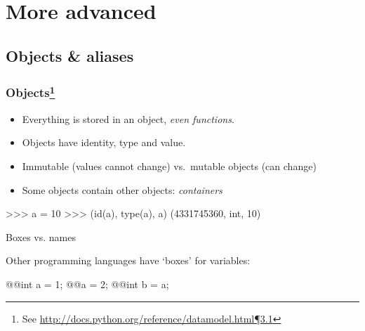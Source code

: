 \documentclass[xetex,10pt]{beamer}
\def\imgpath{../00-img/}
\def\spacer{\vspace*{1em}}
\begin{document}
\section{More advanced}

\subsection{Objects \& aliases}

\begin{frame}[fragile]
	\frametitle{Objects\footnote[frame]{See \href{http://docs.python.org/reference/datamodel.html\#objects-values-and-types}{http://docs.python.org/reference/datamodel.html¶3.1}}}

	\begin{itemize}
		\item Everything is stored in an object, \emph{even functions}.
		\pause
		\item Objects have identity, type and value.
		\pause
		\item Immutable (values cannot change) vs.\ mutable objects (can change)
		\pause
		\item Some objects contain other objects: \emph{containers}
	\end{itemize}
	
	\spacer
	
	\begin{python}
	>>> a = 10
	>>> (id(a), type(a), a)
	(4331745360, int, 10)
	\end{python}

\end{frame}

\begin{frame}[fragile]{Boxes vs. names}
	
	Other programming languages have `boxes' for variables:
	
	\spacer

	\begin{python}
	@@int a = 1;
	@@a = 2;
	@@int b = a;
	\end{python}
	
	\spacer
	
	\begin{center}
	\end{center}
\end{frame}
\end{document}
